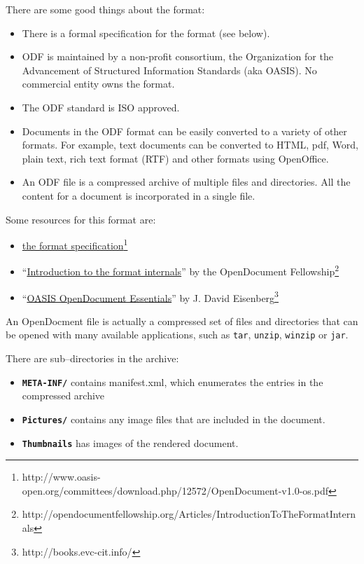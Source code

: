 \documentclass[12pt]{article}
\begin{document}
There are some good things about the format:
\begin{itemize}
   \item There is a formal specification for the format (see below).
   \item ODF is maintained by a non-profit consortium, the Organization for the Advancement of Structured Information Standards (aka OASIS). No commercial entity owns the format.
   \item The ODF standard is ISO approved.
   \item Documents in the ODF format can be easily converted to a variety of other formats. For example, text documents can be converted to HTML, pdf, Word, plain text, rich text format (RTF) and other formats using OpenOffice. 
   \item An ODF file is a compressed archive of multiple files and directories. All the content for a document is incorporated in a single file.
\end{itemize}	

Some resources for this format are:
\begin{itemize}
\item \href{http://www.oasis-open.org/committees/download.php/12572/OpenDocument-v1.0-os.pdf} {the format specification}\footnote{http://www.oasis-open.org/committees/download.php/12572/OpenDocument-v1.0-os.pdf}
\item ``\href{http://opendocumentfellowship.org/Articles/IntroductionToTheFormatInternals} {Introduction to the format internals}'' by the OpenDocument Fellowship\footnote{http://opendocumentfellowship.org/Articles/IntroductionToTheFormatInternals}
\item ``\href{http://books.evc-cit.info/} {OASIS OpenDocument Essentials}'' by J. David Eisenberg\footnote{http://books.evc-cit.info/}
\end{itemize}


An OpenDocment file is actually a compressed set of files and directories that can be opened with many available applications, such as \texttt{tar}, \texttt{unzip}, \texttt{winzip} or \texttt{jar}. 

There are sub--directories in the archive:
\begin{itemize}
\item {\bf \tt META-INF/} contains manifest.xml, which enumerates the entries in the compressed archive
\item {\bf \tt Pictures/} contains any image files that are included in the document. 
\item {\bf \tt Thumbnails} has images of the rendered document.
\end{itemize}
\end{document}
